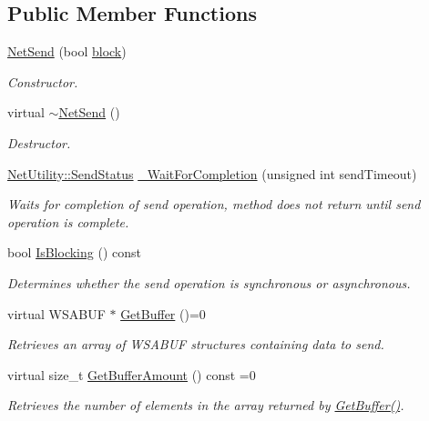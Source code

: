 \subsection*{Public Member Functions}
\begin{DoxyCompactItemize}
\item 
\hyperlink{class_net_send_a158dd7a7b20bbb958f0dcdb0b53fb2bb}{NetSend} (bool \hyperlink{class_net_send_afd9338a4ab3648178d0b5c816a0852d1}{block})
\begin{DoxyCompactList}\small\item\em Constructor. \item\end{DoxyCompactList}\item 
\hypertarget{class_net_send_a8f2f011d6d5f7682cdffb8d176a4fcd8}{
virtual \hyperlink{class_net_send_a8f2f011d6d5f7682cdffb8d176a4fcd8}{$\sim$NetSend} ()}
\label{class_net_send_a8f2f011d6d5f7682cdffb8d176a4fcd8}

\begin{DoxyCompactList}\small\item\em Destructor. \item\end{DoxyCompactList}\item 
\hyperlink{class_net_utility_a8051eca61204ffd818281419bbf44736}{NetUtility::SendStatus} \hyperlink{class_net_send_a64a1095619b446c688ed7b2c65e9e99b}{\_\-WaitForCompletion} (unsigned int sendTimeout)
\begin{DoxyCompactList}\small\item\em Waits for completion of send operation, method does not return until send operation is complete. \item\end{DoxyCompactList}\item 
bool \hyperlink{class_net_send_af3db76be93c6b83c8855d9f09983aca3}{IsBlocking} () const 
\begin{DoxyCompactList}\small\item\em Determines whether the send operation is synchronous or asynchronous. \item\end{DoxyCompactList}\item 
virtual WSABUF $\ast$ \hyperlink{class_net_send_a40c113ecb3007d5d397b2c69887bc4fa}{GetBuffer} ()=0
\begin{DoxyCompactList}\small\item\em Retrieves an array of WSABUF structures containing data to send. \item\end{DoxyCompactList}\item 
virtual size\_\-t \hyperlink{class_net_send_af105bc7adc95d2fa981f580e16fc4c2e}{GetBufferAmount} () const =0
\begin{DoxyCompactList}\small\item\em Retrieves the number of elements in the array returned by \hyperlink{class_net_send_a40c113ecb3007d5d397b2c69887bc4fa}{GetBuffer()}. \item\end{DoxyCompactList}\end{DoxyCompactItemize}
